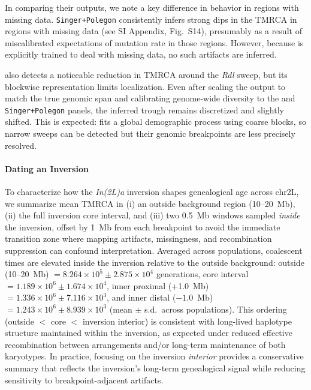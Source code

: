 \documentclass[9pt,twocolumn,twoside]{pnas-new}
\begin{document}
In comparing their outputs, we note a key difference in behavior in regions 
with missing data. \texttt{Singer+Polegon} consistently infers strong dips
in the TMRCA in regions with missing data (see SI Appendix, Fig.~S14),
presumably as a result of miscalibrated expectations of mutation rate in those regions. 
However, because \cxtkit is explicitly trained to deal with missing data, no such
artifacts are inferred. 


\smcpp also detects a noticeable reduction in TMRCA around the \emph{Rdl} sweep,
but its blockwise representation limits localization.
Even after scaling the output to match the true genomic span and calibrating
genome-wide diversity to the \cxtkit and \texttt{Singer+Polegon} panels,
the inferred trough remains discretized and slightly shifted.
This is expected: \smcpp fits a global demographic process using coarse blocks,
so narrow sweeps can be detected but their genomic breakpoints are less precisely resolved.


\paragraph{Dating an Inversion}
To characterize how the \emph{In(2L)a} inversion shapes genealogical age across chr2L, 
we summarize mean TMRCA in 
(i) an outside background region (10--20~Mb), 
(ii) the full inversion core interval, 
and (iii) two 0.5~Mb windows sampled \emph{inside} the inversion, 
offset by 1~Mb from each breakpoint to avoid the immediate transition zone where mapping artifacts,
missingness, 
and recombination suppression can confound interpretation.
Averaged across populations, coalescent times are elevated inside the inversion relative to the outside background:
outside (10--20~Mb) $= 8.264\times 10^{5} \pm 2.875\times 10^{4}$ generations,
core interval $= 1.189\times 10^{6} \pm 1.674\times 10^{4}$,
inner proximal (+1.0~Mb) $= 1.336\times 10^{6} \pm 7.116\times 10^{3}$,
and inner distal ($-1.0$~Mb) $= 1.243\times 10^{6} \pm 8.939\times 10^{3}$ (mean $\pm$ s.d.\ across populations).
This ordering (outside $<$ core $<$ inversion interior) is consistent with long-lived haplotype structure maintained within the inversion, as expected under reduced effective recombination between arrangements and/or long-term maintenance of both karyotypes.
In practice, focusing on the inversion \emph{interior} provides a conservative summary that reflects the inversion's long-term genealogical signal while reducing sensitivity to breakpoint-adjacent artifacts.
\end{document}

